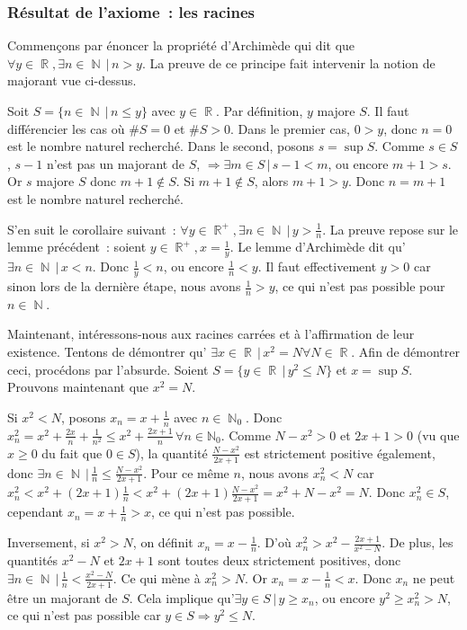 \documentclass{article}
\DeclareMathOperator{\N}{\mathbb N}
\DeclareMathOperator{\R}{\mathbb R}
\theoremstyle{definition}
\theoremstyle{remark}
\begin{document}
		\subsubsection{Résultat de l'axiome~: les racines}
			Commençons par énoncer la propriété d'Archimède qui dit que $\forall y\in \R, \exists n \in \N \, | \, n > y$.
			La preuve de ce principe fait intervenir la notion de majorant vue ci-dessus.

			Soit $S = \{n \in \N \, | \, n \leq y\}$ avec $y \in \R$. Par définition, $y$ majore $S$. Il faut différencier les cas où
			$\#S = 0$ et $\#S > 0$. Dans le premier cas, $0 > y$, donc $n = 0$ est le nombre naturel recherché. Dans le second, posons $s = \sup S$.
			Comme $s \in S$, $s - 1$ n'est pas un majorant de $S$, $\Rightarrow \exists m \in S \, | \, s - 1 < m$, ou encore $m + 1 > s$. Or $s$
			majore $S$ donc $m + 1 \not \in S$. Si $m + 1 \not \in S$, alors $m+1 > y$. Donc $n = m + 1$ est le nombre naturel recherché.

			S'en suit le corollaire suivant~: $\forall y \in \R^+, \exists n \in \N \, | \, y > \frac 1n$. La preuve repose sur le lemme
			précédent~: soient $y \in \R^+, x = \frac 1y$. Le lemme d'Archimède dit qu'$\exists n \in \N \, | \, x < n$. Donc
			$\frac 1y < n$, ou encore $\frac 1n < y$. Il faut effectivement $y > 0$ car sinon lors de la dernière étape, nous avons $\frac 1n > y$,
			ce qui n'est pas possible pour $n \in \N$.

			Maintenant, intéressons-nous aux racines carrées et à l'affirmation de leur existence. Tentons de démontrer qu'
			$\exists x \in \R \, | \, x^2 = N \forall N \in \R$. Afin de démontrer ceci, procédons par l'absurde. Soient
			$S = \{y \in \R \, | \, y^2 \leq N\}$ et $x = \sup S$. Prouvons maintenant que $x^2 = N$.

			Si $x^2 < N$, posons $x_n = x + \frac 1n$ avec $n \in \N_0$. Donc
			$x_n^2 = x^2 + \frac {2x}{n} + \frac {1}{n^2} \leq x^2 + \frac {2x+1}{n} \, \forall n \in \mathbb N_0$. Comme $N - x^2 > 0$ et $2x + 1 > 0$ (vu
			que $x \geq 0$ du fait que $0 \in S$), la quantité $\frac {N - x^2}{2x + 1}$ est strictement positive également, donc
			$\exists n \in \N \, | \, \frac 1n \leq \frac {N - x^2}{2x + 1}$. Pour ce même $n$, nous avons $x_n^2 < N$ car
			$x_n^2 < x^2 + (2x+1)\frac 1n < x^2 + (2x+1)\frac {N - x^2}{2x + 1} = x^2 + N - x^2 = N$. Donc $x_n^2 \in S$, cependant $x_n = x + \frac 1n > x$,
			ce qui n'est pas possible.

			Inversement, si $x^2 > N$, on définit $x_n = x - \frac 1n$. D'où $x_n^2 >x^2 - \frac {2x+1}{x^2 - N}$. De plus, les quantités $x^2 - N$
			et $2x + 1$ sont toutes deux strictement positives, donc $\exists n \in \N \, | \, \frac 1n < \frac {x^2 - N}{2x + 1}$. Ce qui
			mène à $x_n^2 > N$. Or $x_n = x - \frac 1n < x$. Donc $x_n$ ne peut être un majorant de $S$. Cela implique qu'$\exists y \in S \, | \, y \geq x_n$,
			ou encore $y^2 \geq x_n^2 > N$, ce qui n'est pas possible car $y \in S \Rightarrow y^2 \leq N$.
\end{document}
